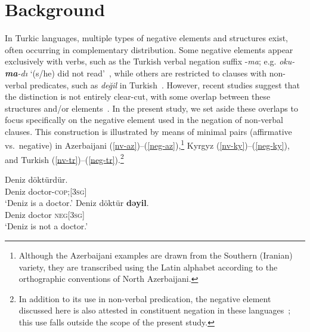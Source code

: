 \documentclass[10pt, a4paper]{article}
\newcommand{\gl}[1]{\textsc{#1}}
\begin{document}
\section{Background}

In Turkic languages, multiple types of negative elements and structures exist, often occurring in complementary distribution.
Some negative elements appear exclusively with verbs, such as the Turkish verbal negation suffix -\textit{ma}; e.g. \textit{oku-\textbf{ma}-dı} `(s/he) did not read'~\citep{kornfilt2013}, while others are restricted to clauses with non-verbal predicates, such as \textit{değil} in Turkish~\citep{lee1996grammar, robbeets2020, kornfilt2013}.
However, recent studies suggest that the distinction is not entirely clear-cut, with some overlap between these structures and/or elements~\citep{seydi2020}.
In the present study, we set aside these overlaps to focus specifically on the negative element used in the negation of non-verbal clauses. This construction is illustrated by means of minimal pairs (affirmative vs.\ negative) in Azerbaijani (\ref{nv-az})--(\ref{neg-az}),\footnote{Although the Azerbaijani examples are drawn from the Southern (Iranian) variety, they are transcribed using the Latin alphabet according to the orthographic conventions of North Azerbaijani.} Kyrgyz (\ref{nv-ky})--(\ref{neg-ky}), and Turkish (\ref{nv-tr})--(\ref{neg-tr}).\footnote{In addition to its use in non-verbal predication, the negative element discussed here is also attested in constituent negation in these languages~\citep{kornfilt2013}; this use falls outside the scope of the present study.}

\begin{exe}
  \ex
  \begin{xlist}
    \ex\label{nv-az}
    \gll Deniz döktürdür.\\ %
    Deniz doctor-\gl{cop};[3\gl{sg}]\\
    \glt `Deniz is a doctor.'
    \ex\label{neg-az}
    \gll Deniz döktür \textbf{dəyil}.\\ %
    Deniz doctor \gl{neg}[3\gl{sg}]\\
    \glt `Deniz is not a doctor.'
  \end{xlist}
\end{exe}
\end{document}
